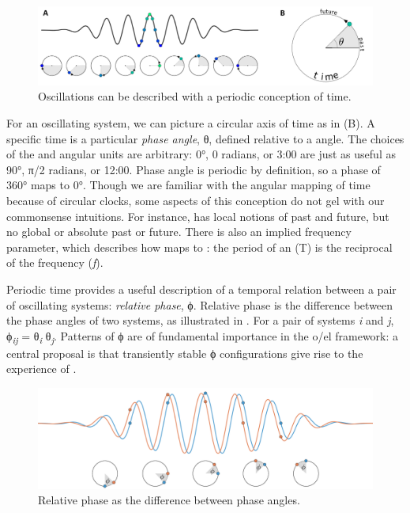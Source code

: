   
\begin{figure}
\includegraphics[width=\textwidth]{figures/Tilsen-img2.png}
\caption{Oscillations can be described with a periodic conception of time.}
\label{fig:1:2}
\end{figure}
 

  For an oscillating system, we can picture a circular axis of time as in {}(B). A specific time is a particular \textit{phase angle}, θ, defined relative to a  angle. The choices of the  and angular units are arbitrary: 0°, 0 radians, or 3:00 are just as useful as 90°, π/2 radians, or 12:00. Phase angle is periodic by definition, so a phase of 360° maps to 0°. Though we are familiar with the angular mapping of time because of circular clocks, some aspects of this conception do not gel with our commonsense intuitions. For instance,  has local notions of past and future, but no global or absolute past or future. There is also an implied frequency parameter, which describes how  maps to : the period of an  (T) is the reciprocal of the frequency (\textit{f}).

  Periodic time provides a useful description of a temporal relation between a pair of oscillating systems: \textit{relative phase}, ϕ. Relative phase is the difference between the phase angles of two systems, as illustrated in {}. For a pair of systems \textit{i} and \textit{j}, ϕ\textit{\textsubscript{ij}}\textsubscript{} = θ\textit{\textsubscript{i}} \textminus{} θ\textit{\textsubscript{j}}. Patterns of ϕ are of fundamental importance in the o/el framework: a central proposal is that transiently stable ϕ configurations give rise to the experience of .  

  
\begin{figure}
\includegraphics[width=\textwidth]{figures/Tilsen-img3.png}
\caption{Relative phase as the difference between phase angles.}
\label{fig:1:3}
\end{figure}
 

